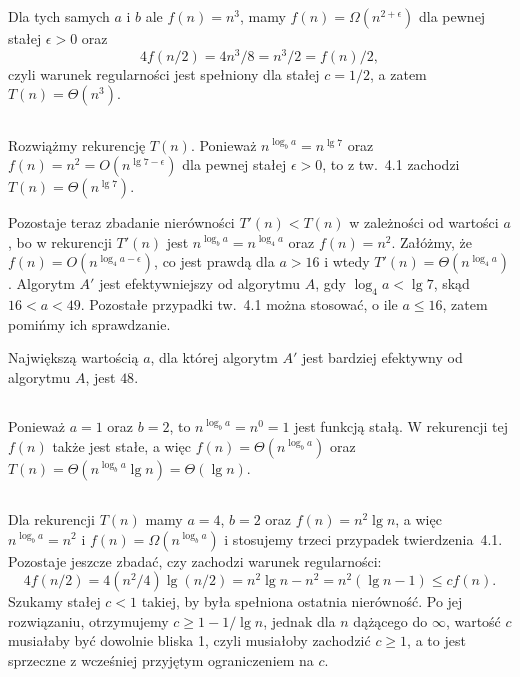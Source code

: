 \subsubsection{}
Dla tych samych $a$ i $b$ ale $f(n)=n^3$, mamy $f(n)=\Omega(n^{2+\epsilon})$ dla pewnej stałej $\epsilon>0$ oraz
\[
	4f(n/2) = 4n^3\!/8 = n^3\!/2 = f(n)/2,
\]
czyli warunek regularności jest spełniony dla stałej $c=1/2$, a zatem $T(n)=\Theta(n^3)$.

\subsection{} %
Rozwiążmy rekurencję $T(n)$. Ponieważ $n^{\log_ba}=n^{\lg7}$ oraz $f(n)=n^2=O(n^{\lg7-\epsilon})$ dla pewnej stałej $\epsilon>0$, to z tw.~4.1 zachodzi $T(n)=\Theta(n^{\lg7})$.

Pozostaje teraz zbadanie nierówności $T'(n)<T(n)$ w zależności od wartości $a$, bo w rekurencji $T'(n)$ jest $n^{\log_ba}=n^{\log_4a}$ oraz $f(n)=n^2$. Załóżmy, że $f(n)=O(n^{\log_4a-\epsilon})$, co jest prawdą dla $a>16$ i wtedy $T'(n)=\Theta(n^{\log_4a})$. Algorytm $A'$ jest efektywniejszy od algorytmu $A$, gdy $\log_4a<\lg7$, skąd $16<a<49$. Pozostałe przypadki tw.~4.1 można stosować, o ile $a\le16$, zatem pomińmy ich sprawdzanie.

Największą wartością $a$, dla której algorytm $A'$ jest bardziej efektywny od algorytmu $A$, jest $48$.

\subsection{} %
Ponieważ $a=1$ oraz $b=2$, to $n^{\log_ba}=n^0=1$ jest funkcją stałą. W rekurencji tej $f(n)$ także jest stałe, a więc $f(n)=\Theta(n^{\log_ba})$ oraz $T(n)=\Theta(n^{\log_ba}\lg n)=\Theta(\lg n)$.

\subsection{} %
Dla rekurencji $T(n)$ mamy $a=4$, $b=2$ oraz $f(n)=n^2\lg n$, a więc $n^{\log_ba}=n^2$ i $f(n)=\Omega(n^{\log_ba})$ i stosujemy trzeci przypadek twierdzenia~4.1. Pozostaje jeszcze zbadać, czy zachodzi warunek regularności:
\[
	4f(n/2) = 4(n^2\!/4)\lg(n/2) = n^2\lg n-n^2 = n^2(\lg n-1) \le cf(n).
\]
Szukamy stałej $c<1$ takiej, by była spełniona ostatnia nierówność. Po jej rozwiązaniu, otrzymujemy $c\ge1-1/\!\lg n$, jednak dla $n$ dążącego do $\infty$, wartość $c$ musiałaby być dowolnie bliska 1, czyli musiałoby zachodzić $c\ge1$, a to jest sprzeczne z wcześniej przyjętym ograniczeniem na $c$.

